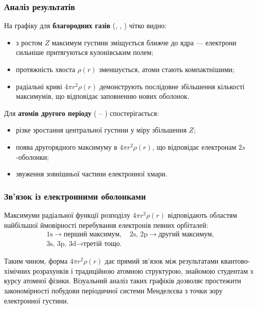 \subsubsection{Аналіз результатів}

На графіку для \textbf{благородних газів} (, , ) чітко видно:
\begin{itemize}
    \item з ростом $Z$ максимум густини зміщується ближче до ядра --- електрони сильніше притягуються кулонівським полем;
    \item протяжність хвоста $\rho(r)$ зменшується, атоми стають компактнішими;
    \item радіальні криві $4\pi r^2\rho(r)$ демонструють послідовне збільшення кількості максимумів, що відповідає заповненню нових оболонок.
\end{itemize}

Для \textbf{атомів другого періоду} ( -- ) спостерігається:
\begin{itemize}
    \item різке зростання центральної густини у міру збільшення $Z$;
    \item поява другорядного максимуму в $4\pi r^2\rho(r)$, що відповідає електронам $2s$-оболонки;
    \item звуження зовнішньої частини електронної хмари.
\end{itemize}

\subsubsection{Зв’язок із електронними оболонками}

Максимуми радіальної функції розподілу $4\pi r^2\rho(r)$ відповідають областям найбільшої ймовірності перебування електронів певних орбіталей:
\begin{align*}
    \text{1s} \rightarrow \text{перший максимум}, \quad
    \text{2s, 2p} \rightarrow \text{другий максимум}, \\
    \text{3s, 3p, 3d} \rightarrow \text{третій тощо.}
\end{align*}

Таким чином, форма $4\pi r^2\rho(r)$ дає прямий зв’язок між результатами квантово-хімічних розрахунків і традиційною атомною структурою, знайомою студентам з курсу атомної фізики.
Візуальний аналіз таких графіків дозволяє простежити закономірності побудови періодичної системи Менделєєва з точки зору електронної густини.

